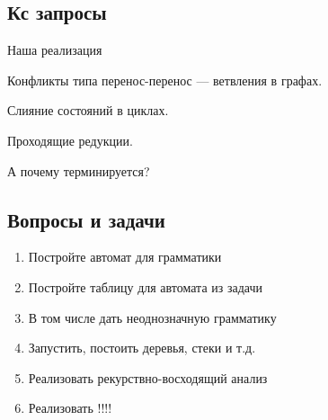 \subsection{Кс запросы}


Наша реализация~\cite{10.1007/978-3-319-41579-6_22}

Конфликты типа перенос-перенос --- ветвления в графах.

Слияние состояний в циклах.

Проходящие редукции.

А почему терминируется?


\subsection{Вопросы и задачи}
\begin{enumerate}
\item Постройте автомат для грамматики
\item Постройте таблицу для автомата из задачи
\item В том числе дать неоднозначную грамматику
\item Запустить, постоить деревья, стеки и т.д.
\item Реализовать рекурствно-восходящий анализ
\item Реализовать !!!!
\end{enumerate}
